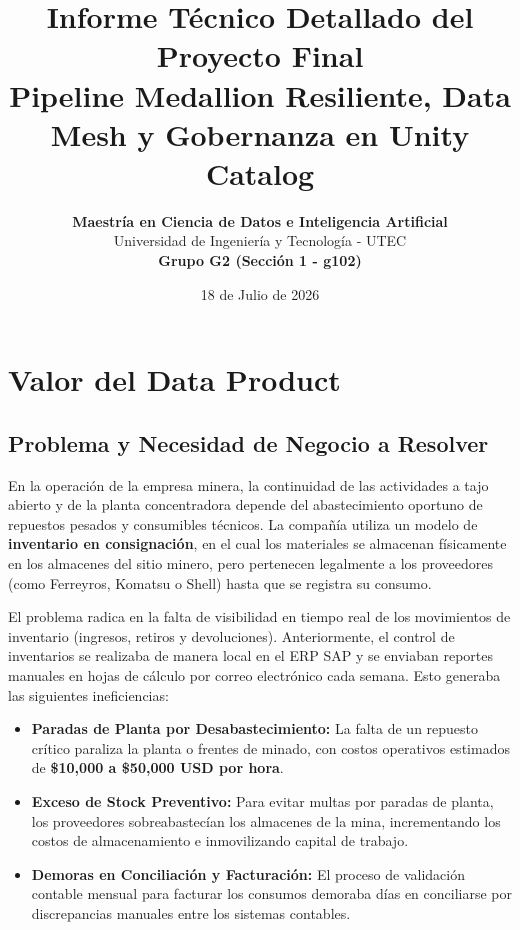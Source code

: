 \documentclass[11pt,a4paper]{article}
\title{\textbf{Informe Técnico Detallado del Proyecto Final}\\
\large Pipeline Medallion Resiliente, Data Mesh y Gobernanza en Unity Catalog}
\author{\textbf{Maestría en Ciencia de Datos e Inteligencia Artificial} \\ Universidad de Ingeniería y Tecnología - UTEC \\ \textbf{Grupo G2 (Sección 1 - g102)}}
\date{18 de Julio de 2026}
\begin{document}
\maketitle
\tableofcontents
\newpage

\section{Valor del Data Product}

\subsection{Problema y Necesidad de Negocio a Resolver}
En la operación de la empresa minera, la continuidad de las actividades a tajo abierto y de la planta concentradora depende del abastecimiento oportuno de repuestos pesados y consumibles técnicos. La compañía utiliza un modelo de \textbf{inventario en consignación}, en el cual los materiales se almacenan físicamente en los almacenes del sitio minero, pero pertenecen legalmente a los proveedores (como Ferreyros, Komatsu o Shell) hasta que se registra su consumo.

El problema radica en la falta de visibilidad en tiempo real de los movimientos de inventario (ingresos, retiros y devoluciones). Anteriormente, el control de inventarios se realizaba de manera local en el ERP SAP y se enviaban reportes manuales en hojas de cálculo por correo electrónico cada semana. Esto generaba las siguientes ineficiencias:
\begin{itemize}
    \item \textbf{Paradas de Planta por Desabastecimiento:} La falta de un repuesto crítico paraliza la planta o frentes de minado, con costos operativos estimados de \textbf{\$10,000 a \$50,000 USD por hora}.
    \item \textbf{Exceso de Stock Preventivo:} Para evitar multas por paradas de planta, los proveedores sobreabastecían los almacenes de la mina, incrementando los costos de almacenamiento e inmovilizando capital de trabajo.
    \item \textbf{Demoras en Conciliación y Facturación:} El proceso de validación contable mensual para facturar los consumos demoraba días en conciliarse por discrepancias manuales entre los sistemas contables.
\end{itemize}
\end{document}
